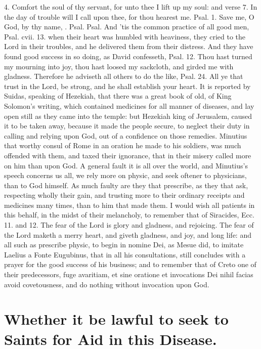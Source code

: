 {4. Comfort the soul of thy servant, for unto thee I lift up my soul:
and verse 7. In the day of trouble will I call upon thee, for thou
hearest me. Psal.  1. Save me, O God, by thy name, \etc. Psal.
 Psal.  And 'tis the common practice of all good men, Psal.
cvii. 13. when their heart was humbled with heaviness, they cried to
the Lord in their troubles, and he delivered them from their distress.
And they have found good success in so doing, as David confesseth,
Psal.  12. Thou hast turned my mourning into joy, thou hast loosed
my sackcloth, and girded me with gladness. Therefore he adviseth all
others to do the like, Psal.  24. All ye that trust in the Lord,
be strong, and he shall establish your heart. It is reported by
Suidas, speaking of Hezekiah, that there was a great book of old,
of King Solomon's writing, which contained medicines for all manner of
diseases, and lay open still as they came into the temple: but Hezekiah
king of Jerusalem, caused it to be taken away, because it made the
people secure, to neglect their duty in calling and relying upon God,
out of a confidence on those remedies. Minutius that worthy
consul of Rome in an oration he made to his soldiers, was much offended
with them, and taxed their ignorance, that in their misery called more
on him than upon God. A general fault it is all over the world, and
Minutius's speech concerns us all, we rely more on physic, and seek
oftener to physicians, than to God himself. As much faulty are they
that prescribe, as they that ask, respecting wholly their gain, and
trusting more to their ordinary receipts and medicines many times, than
to him that made them. I would wish all patients in this behalf, in the
midst of their melancholy, to remember that of Siracides, Ecc.  11.
and 12. The fear of the Lord is glory and gladness, and rejoicing. The
fear of the Lord maketh a merry heart, and giveth gladness, and joy,
and long life: and all such as prescribe physic, to begin in nomine
Dei, as Mesue did, to imitate Laelius a Fonte Eugubinus, that in
all his consultations, still concludes with a prayer for the good
success of his business; and to remember that of Creto one of their
predecessors, fuge avaritiam, et sine oratione et invocations Dei nihil
facias avoid covetousness, and do nothing without invocation upon God.


\section[Whether it be lawful to seek to Saints for Aid]{Whether it be lawful to seek to Saints for Aid in this Disease.}

}
